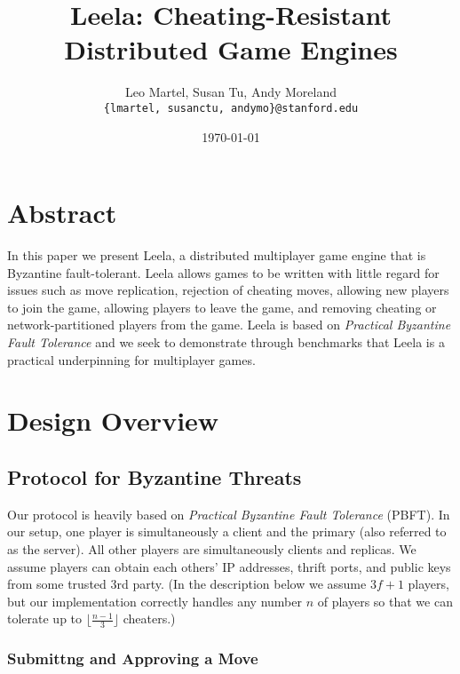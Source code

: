 \documentclass[11pt]{article}
\title{Leela: Cheating-Resistant Distributed Game Engines}
\author{Leo Martel, Susan Tu, Andy Moreland \\ \tt{\{lmartel, susanctu, andymo\}@stanford.edu}}
\date{\today}
\begin{document}
\maketitle

\begin{multicols}{2}

\section{Abstract}
In this paper we present Leela, a distributed multiplayer game engine that is Byzantine fault-tolerant. Leela allows games to be written with little regard for issues such as move replication, rejection of cheating moves, allowing new players to join the game, allowing players to leave the game, and removing cheating or network-partitioned players from the game. Leela is based on \emph{Practical Byzantine Fault Tolerance} \cite{castro} and we seek to demonstrate through benchmarks that Leela is a practical underpinning for multiplayer games.
\section{Design Overview}
\subsection{Protocol for Byzantine Threats}

Our protocol is heavily based on \emph{Practical Byzantine Fault Tolerance} (PBFT). In our setup, one player is simultaneously a client and the primary (also referred to as the server). All other players are simultaneously clients and replicas. We assume players can obtain each others' IP addresses, thrift ports, and public keys from some trusted 3rd party. (In the description below we assume $3f+1$ players, but our implementation correctly handles any number $n$ of players so that we can tolerate up to $\lfloor \frac{n-1}{3}\rfloor$ cheaters.)
\subsubsection{Submittng and Approving a Move}


\end{multicols}
\end{document}
